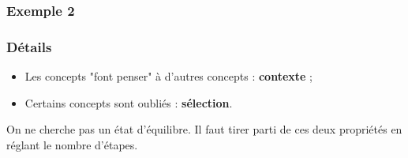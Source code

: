 \documentclass[12pt, handout]{beamer}
\begin{document}
\begin{frame}
  \frametitle{Exemple 2}
% 
% 
%   

\end{frame}


\begin{frame}
 \frametitle{Détails}
 
 \begin{itemize}
  \item Les concepts "font penser" à d'autres concepts : \textbf{contexte} ;
  \item Certains concepts sont oubliés : \textbf{sélection}.
 \end{itemize}

 On ne cherche pas un état d'équilibre. Il faut tirer parti de ces deux propriétés en réglant le nombre d'étapes.
 
\end{frame}
\end{document}
